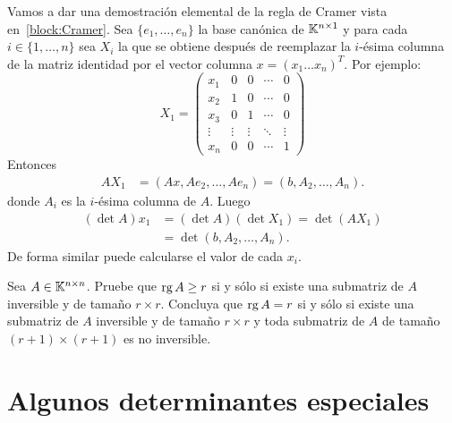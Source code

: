 \begin{block}
    Vamos a dar una demostración elemental de la regla de Cramer vista
    en~\ref{block:Cramer}.  Sea $\{e_1,\dots,e_n\}$ la base canónica de
    $\mathbb{K}^{n\times1}$ y para cada $i\in\{1,\dots,n\}$ sea $X_i$ la que se obtiene
    después de reemplazar la $i$-ésima columna de la matriz identidad por el
    vector columna $x=(x_1\dots x_n)^T$. Por ejemplo:
	\[
	X_1=\begin{pmatrix}
		x_1 & 0 & 0 & \cdots & 0\\
		x_2 & 1 & 0 & \cdots & 0\\
        x_3 & 0 & 1 & \cdots & 0\\
		\vdots & \vdots & \vdots & \ddots & \vdots\\
		x_n & 0 & 0 & \cdots & 1
	\end{pmatrix}
	\]
	Entonces 
	\begin{align*}
		AX_1&=(Ax,Ae_2,\dots,Ae_n)
		=(b,A_2,\dots,A_n).
	\end{align*}
	donde $A_i$ es la $i$-ésima columna de $A$. Luego
	\begin{align*}
		(\det A)x_1&=(\det A)(\det X_1)=\det(AX_1)\\
		&=\det(b,A_2,\dots,A_n).
	\end{align*}
	De forma similar puede calcularse el valor de cada $x_i$. 
\end{block}

\begin{xca}
	\label{xca:rango_submatriz}
	Sea $A\in\mathbb{K}^{n\times n}$. Pruebe que $\operatorname{rg} A\geq r$ si y sólo si existe una
	submatriz de $A$ inversible y de tamaño $r\times r$. Concluya que $\operatorname{rg} A=r$
	si y sólo si existe una submatriz de $A$ inversible y de tamaño $r\times r$
	y toda submatriz de $A$ de tamaño $(r+1)\times(r+1)$ es no inversible. 
\end{xca}

\section{Algunos determinantes especiales}

